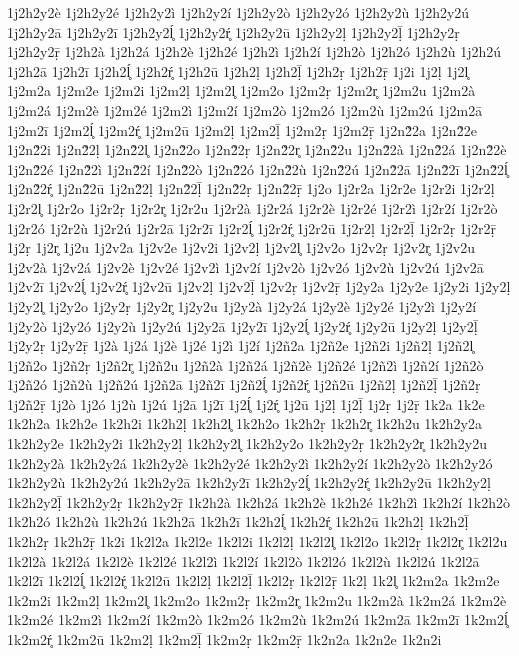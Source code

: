 {1j2h2y2è
1j2h2y2é
1j2h2y2ì
1j2h2y2í
1j2h2y2ò
1j2h2y2ó
1j2h2y2ù
1j2h2y2ú
1j2h2y2ā
1j2h2y2ī
1j2h2y2ĺ̥
1j2h2y2ŕ̥
1j2h2y2ū
1j2h2y2ḷ
1j2h2y2ḹ
1j2h2y2ṛ
1j2h2y2ṝ
1j2h2à
1j2h2á
1j2h2è
1j2h2é
1j2h2ì
1j2h2í
1j2h2ò
1j2h2ó
1j2h2ù
1j2h2ú
1j2h2ā
1j2h2ī
1j2h2ĺ̥
1j2h2ŕ̥
1j2h2ū
1j2h2ḷ
1j2h2ḹ
1j2h2ṛ
1j2h2ṝ
1j2i
1j2ḷ
1j2l̥
1j2m2a
1j2m2e
1j2m2i
1j2m2ḷ
1j2m2l̥
1j2m2o
1j2m2ṛ
1j2m2r̥
1j2m2u
1j2m2à
1j2m2á
1j2m2è
1j2m2é
1j2m2ì
1j2m2í
1j2m2ò
1j2m2ó
1j2m2ù
1j2m2ú
1j2m2ā
1j2m2ī
1j2m2ĺ̥
1j2m2ŕ̥
1j2m2ū
1j2m2ḷ
1j2m2ḹ
1j2m2ṛ
1j2m2ṝ
1j2n2̃2a
1j2n2̃2e
1j2n2̃2i
1j2n2̃2ḷ
1j2n2̃2l̥
1j2n2̃2o
1j2n2̃2ṛ
1j2n2̃2r̥
1j2n2̃2u
1j2n2̃2à
1j2n2̃2á
1j2n2̃2è
1j2n2̃2é
1j2n2̃2ì
1j2n2̃2í
1j2n2̃2ò
1j2n2̃2ó
1j2n2̃2ù
1j2n2̃2ú
1j2n2̃2ā
1j2n2̃2ī
1j2n2̃2ĺ̥
1j2n2̃2ŕ̥
1j2n2̃2ū
1j2n2̃2ḷ
1j2n2̃2ḹ
1j2n2̃2ṛ
1j2n2̃2ṝ
1j2o
1j2r2a
1j2r2e
1j2r2i
1j2r2ḷ
1j2r2l̥
1j2r2o
1j2r2ṛ
1j2r2r̥
1j2r2u
1j2r2à
1j2r2á
1j2r2è
1j2r2é
1j2r2ì
1j2r2í
1j2r2ò
1j2r2ó
1j2r2ù
1j2r2ú
1j2r2ā
1j2r2ī
1j2r2ĺ̥
1j2r2ŕ̥
1j2r2ū
1j2r2ḷ
1j2r2ḹ
1j2r2ṛ
1j2r2ṝ
1j2ṛ
1j2r̥
1j2u
1j2v2a
1j2v2e
1j2v2i
1j2v2ḷ
1j2v2l̥
1j2v2o
1j2v2ṛ
1j2v2r̥
1j2v2u
1j2v2à
1j2v2á
1j2v2è
1j2v2é
1j2v2ì
1j2v2í
1j2v2ò
1j2v2ó
1j2v2ù
1j2v2ú
1j2v2ā
1j2v2ī
1j2v2ĺ̥
1j2v2ŕ̥
1j2v2ū
1j2v2ḷ
1j2v2ḹ
1j2v2ṛ
1j2v2ṝ
1j2y2a
1j2y2e
1j2y2i
1j2y2ḷ
1j2y2l̥
1j2y2o
1j2y2ṛ
1j2y2r̥
1j2y2u
1j2y2à
1j2y2á
1j2y2è
1j2y2é
1j2y2ì
1j2y2í
1j2y2ò
1j2y2ó
1j2y2ù
1j2y2ú
1j2y2ā
1j2y2ī
1j2y2ĺ̥
1j2y2ŕ̥
1j2y2ū
1j2y2ḷ
1j2y2ḹ
1j2y2ṛ
1j2y2ṝ
1j2à
1j2á
1j2è
1j2é
1j2ì
1j2í
1j2ñ2a
1j2ñ2e
1j2ñ2i
1j2ñ2ḷ
1j2ñ2l̥
1j2ñ2o
1j2ñ2ṛ
1j2ñ2r̥
1j2ñ2u
1j2ñ2à
1j2ñ2á
1j2ñ2è
1j2ñ2é
1j2ñ2ì
1j2ñ2í
1j2ñ2ò
1j2ñ2ó
1j2ñ2ù
1j2ñ2ú
1j2ñ2ā
1j2ñ2ī
1j2ñ2ĺ̥
1j2ñ2ŕ̥
1j2ñ2ū
1j2ñ2ḷ
1j2ñ2ḹ
1j2ñ2ṛ
1j2ñ2ṝ
1j2ò
1j2ó
1j2ù
1j2ú
1j2ā
1j2ī
1j2ĺ̥
1j2ŕ̥
1j2ū
1j2ḷ
1j2ḹ
1j2ṛ
1j2ṝ
1k2a
1k2e
1k2h2a
1k2h2e
1k2h2i
1k2h2ḷ
1k2h2l̥
1k2h2o
1k2h2ṛ
1k2h2r̥
1k2h2u
1k2h2y2a
1k2h2y2e
1k2h2y2i
1k2h2y2ḷ
1k2h2y2l̥
1k2h2y2o
1k2h2y2ṛ
1k2h2y2r̥
1k2h2y2u
1k2h2y2à
1k2h2y2á
1k2h2y2è
1k2h2y2é
1k2h2y2ì
1k2h2y2í
1k2h2y2ò
1k2h2y2ó
1k2h2y2ù
1k2h2y2ú
1k2h2y2ā
1k2h2y2ī
1k2h2y2ĺ̥
1k2h2y2ŕ̥
1k2h2y2ū
1k2h2y2ḷ
1k2h2y2ḹ
1k2h2y2ṛ
1k2h2y2ṝ
1k2h2à
1k2h2á
1k2h2è
1k2h2é
1k2h2ì
1k2h2í
1k2h2ò
1k2h2ó
1k2h2ù
1k2h2ú
1k2h2ā
1k2h2ī
1k2h2ĺ̥
1k2h2ŕ̥
1k2h2ū
1k2h2ḷ
1k2h2ḹ
1k2h2ṛ
1k2h2ṝ
1k2i
1k2l2a
1k2l2e
1k2l2i
1k2l2ḷ
1k2l2l̥
1k2l2o
1k2l2ṛ
1k2l2r̥
1k2l2u
1k2l2à
1k2l2á
1k2l2è
1k2l2é
1k2l2ì
1k2l2í
1k2l2ò
1k2l2ó
1k2l2ù
1k2l2ú
1k2l2ā
1k2l2ī
1k2l2ĺ̥
1k2l2ŕ̥
1k2l2ū
1k2l2ḷ
1k2l2ḹ
1k2l2ṛ
1k2l2ṝ
1k2ḷ
1k2l̥
1k2m2a
1k2m2e
1k2m2i
1k2m2ḷ
1k2m2l̥
1k2m2o
1k2m2ṛ
1k2m2r̥
1k2m2u
1k2m2à
1k2m2á
1k2m2è
1k2m2é
1k2m2ì
1k2m2í
1k2m2ò
1k2m2ó
1k2m2ù
1k2m2ú
1k2m2ā
1k2m2ī
1k2m2ĺ̥
1k2m2ŕ̥
1k2m2ū
1k2m2ḷ
1k2m2ḹ
1k2m2ṛ
1k2m2ṝ
1k2n2a
1k2n2e
1k2n2i
}

